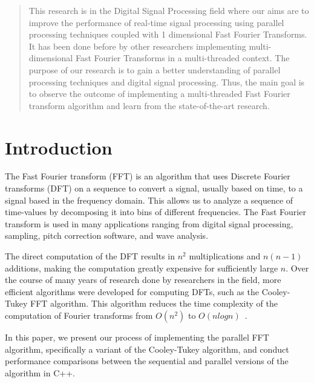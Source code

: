 \documentclass[journal]{IEEEtran}
\begin{document}
\maketitle

\begin{abstract}
This research is in the Digital Signal Processing field 
where our aims are to improve the performance of real-time signal 
processing using parallel processing techniques coupled with 1 
dimensional Fast Fourier Transforms. 
It has been done before by other researchers implementing 
multi-dimensional Fast Fourier Transforms in a multi-threaded context. 
The purpose of our research is to gain a better understanding of 
parallel processing techniques and digital signal processing. 
Thus, the main goal is to observe the outcome of implementing a 
multi-threaded Fast Fourier transform algorithm and learn from the 
state-of-the-art research.
\end{abstract}

\section{Introduction}
	\par {The Fast Fourier transform (FFT) is an algorithm that uses Discrete Fourier transforms
	 (DFT) on a sequence to convert a signal, usually based on time, to a signal based in the
	 frequency domain. This allows us to analyze a sequence of time-values by decomposing it into
	 bins of different frequencies. The Fast Fourier transform is used in many applications ranging
	 from digital signal processing, sampling, pitch correction software, and wave analysis.}

	\par {The direct computation of the DFT results in $n^2$ multiplications and $n(n-1)$ additions,
	making the computation greatly expensive for sufficiently large $n$.  Over the course of many years
	of research done by researchers in the field, more efficient algorithms were developed for computing DFTs,
	such as the Cooley-Tukey FFT algorithm. This algorithm reduces the time complexity of the computation of
	Fourier transforms from $O(n^2)$ to $O(nlogn)$~\cite{Xiang}}.

	\par {In this paper, we present our process of implementing the parallel FFT algorithm, specifically
	a variant of the Cooley-Tukey algorithm, and conduct performance comparisons between the sequential and 
	parallel versions of the algorithm in C++.}
\end{document}

